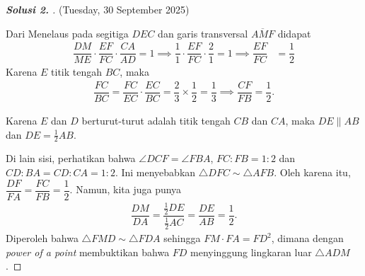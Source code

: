 \begin{proof}[\textbf{Solusi 2. }] (Tuesday, 30 September 2025)
    
    Dari Menelaus pada segitiga $DEC$ dan garis transversal $\overline{AMF}$ didapat
    \begin{align*}
        \dfrac{DM}{ME}\cdot \dfrac{EF}{FC} \cdot \dfrac{CA}{AD} = 1 \implies
        \dfrac{1}{1}\cdot \dfrac{EF}{FC} \cdot \dfrac{2}{1} = 1 \implies
        \dfrac{EF}{FC} &= \dfrac{1}{2}
    \end{align*}
    Karena $E$ titik tengah $BC$, maka 
    \begin{align*}
        \dfrac{FC}{BC} = \dfrac{FC}{EC} \cdot \dfrac{EC}{BC} = \dfrac{2}{3} \times \dfrac{1}{2} = \dfrac{1}{3} \implies \dfrac{CF}{FB} = \dfrac{1}{2}.
    \end{align*}

    Karena $E$ dan $D$ berturut-turut adalah  titik tengah $CB$ dan $CA$, maka $DE \parallel AB$ dan $DE= \frac{1}{2}AB$. 

    Di lain sisi, perhatikan bahwa $\angle DCF = \angle FBA$, $FC:FB=1:2$ dan $CD:BA= CD:CA = 1:2$. Ini menyebabkan $\triangle DFC \sim \triangle AFB$. Oleh karena itu, $\dfrac{DF}{FA} = \dfrac{FC}{FB} = \dfrac{1}{2}$. Namun, kita juga punya
    \begin{align*}
        \dfrac{DM}{DA} = \dfrac{\frac{1}{2}DE}{\frac{1}{2}{AC}} = \dfrac{DE}{AB} = \dfrac{1}{2}.
    \end{align*}
    Diperoleh bahwa $\triangle FMD \sim \triangle FDA$ sehingga $FM \cdot FA = FD^2$, dimana dengan \textit{power of a point} membuktikan bahwa $FD$ menyinggung lingkaran luar $\triangle ADM$.

\end{proof}
